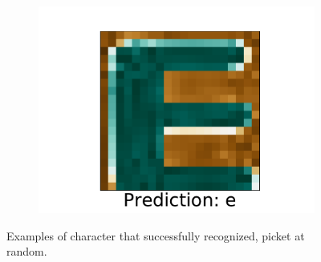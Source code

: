 \documentclass[../main.tex]{subfiles}
\begin{document}
\begin{figure}
\begin{subfigure}[t]{0.15\textwidth}
        \includegraphics[width=\textwidth]{figures/ex/p_4.pdf}
        \label{fig:gull}
    \end{subfigure}
    \caption{Examples of character that \knn successfully recognized, picket at random.}\label{fig:p_knn}
\end{figure}
\end{document}
